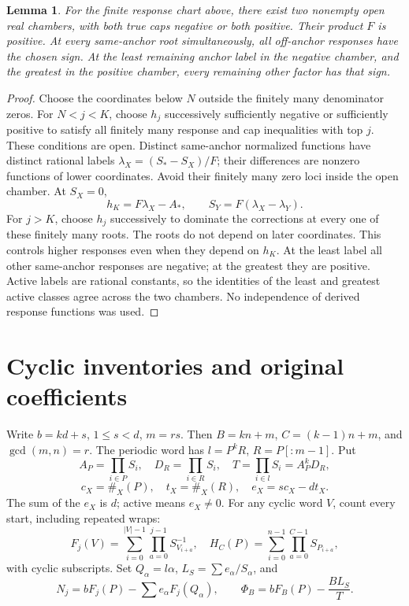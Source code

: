 \documentclass[11pt,a4paper]{amsart}
\numberwithin{equation}{section}
\theoremstyle{plain}
\newtheorem{lemma}[theorem]{Lemma}
\theoremstyle{definition}
\begin{document}
\begin{lemma}\label{lem:exposure}
For the finite response chart above, there exist two nonempty open real chambers, with both true caps negative or both positive.  Their product \(F\) is positive.  At every same-anchor root simultaneously, all off-anchor responses have the chosen sign.  At the least remaining anchor label in the negative chamber, and the greatest in the positive chamber, every remaining other factor has that sign.
\end{lemma}
\begin{proof}
Choose the coordinates below \(N\) outside the finitely many denominator zeros.  For \(N<j<K\), choose \(h_j\) successively sufficiently negative or sufficiently positive to satisfy all finitely many response and cap inequalities with top \(j\).  These conditions are open.  Distinct same-anchor normalized functions have distinct rational labels \(\lambda_X=(S_*-S_X)/F\); their differences are nonzero functions of lower coordinates.  Avoid their finitely many zero loci inside the open chamber.  At \(S_X=0\),
\[
 h_K=F\lambda_X-A_*,\qquad S_Y=F(\lambda_X-\lambda_Y).
\]
For \(j>K\), choose \(h_j\) successively to dominate the corrections at every one of these finitely many roots.  The roots do not depend on later coordinates.  This controls higher responses even when they depend on \(h_K\).  At the least label all other same-anchor responses are negative; at the greatest they are positive.  Active labels are rational constants, so the identities of the least and greatest active classes agree across the two chambers.  No independence of derived response functions was used.
\end{proof}

\section{Cyclic inventories and original coefficients}\label{sec:dual}
Write \(b=kd+s\), \(1\le s<d\), \(m=rs\).  Then \(B=kn+m\), \(C=(k-1)n+m\), and \(\gcd(m,n)=r\).  The periodic word has \(l=P^kR\), \(R=P[:m-1]\).  Put
\[
 A_P=\prod_{i\in P}S_i,\quad D_R=\prod_{i\in R}S_i,\quad T=\prod_{i\in l}S_i=A_P^kD_R,
\]
\[
 c_X=\#_X(P),\quad t_X=\#_X(R),\quad e_X=sc_X-dt_X.
\]
The sum of the \(e_X\) is \(d\); active means \(e_X\ne0\).  For any cyclic word \(V\), count every start, including repeated wraps:
\[
 F_j(V)=\sum_{i=0}^{|V|-1}\prod_{a=0}^{j-1}S_{V_{i+a}}^{-1},\quad
 H_C(P)=\sum_{i=0}^{n-1}\prod_{a=0}^{C-1}S_{P_{i+a}},
\]
with cyclic subscripts.  Set \(Q_\alpha=l\alpha\), \(L_S=\sum e_\alpha/S_\alpha\), and
\[
 N_j=bF_j(P)-\sum e_\alpha F_j(Q_\alpha),\qquad
 \Phi_B=bF_B(P)-\frac{B L_S}{T}.
\]
\end{document}
